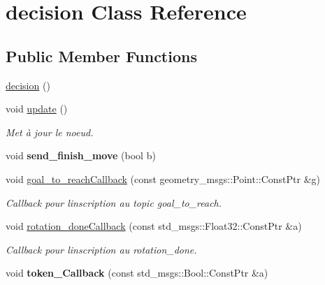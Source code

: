 \hypertarget{classdecision}{}\section{decision Class Reference}
\label{classdecision}
\subsection*{Public Member Functions}
\begin{DoxyCompactItemize}
\item 
\hyperlink{classdecision_a00772c969f42d590e57f3eb37bafe6a6}{decision} ()
\item 
void \hyperlink{classdecision_a5fbd0cdaffc906d31560227560136b59}{update} ()\hypertarget{classdecision_a5fbd0cdaffc906d31560227560136b59}{}\label{classdecision_a5fbd0cdaffc906d31560227560136b59}

\begin{DoxyCompactList}\small\item\em Met à jour le noeud. \end{DoxyCompactList}\item 
void {\bfseries send\+\_\+finish\+\_\+move} (bool b)\hypertarget{classdecision_adabd8116029927f426558cbc87acba0e}{}\label{classdecision_adabd8116029927f426558cbc87acba0e}

\item 
void \hyperlink{classdecision_afddf261c387d28dde5e6881343518ca7}{goal\+\_\+to\+\_\+reach\+Callback} (const geometry\+\_\+msgs\+::\+Point\+::\+Const\+Ptr \&g)
\begin{DoxyCompactList}\small\item\em Callback pour l\textquotesingle{}inscription au topic goal\+\_\+to\+\_\+reach. \end{DoxyCompactList}\item 
void \hyperlink{classdecision_ad6c2257e2304ad3a078d2b64cf425caa}{rotation\+\_\+done\+Callback} (const std\+\_\+msgs\+::\+Float32\+::\+Const\+Ptr \&a)
\begin{DoxyCompactList}\small\item\em Callback pour l\textquotesingle{}inscription au rotation\+\_\+done. \end{DoxyCompactList}\item 
void {\bfseries token\+\_\+\+Callback} (const std\+\_\+msgs\+::\+Bool\+::\+Const\+Ptr \&a)\hypertarget{classdecision_a7e0da40a27e1c320329a5b81f6044c57}{}\label{classdecision_a7e0da40a27e1c320329a5b81f6044c57}


\end{DoxyCompactItemize}
